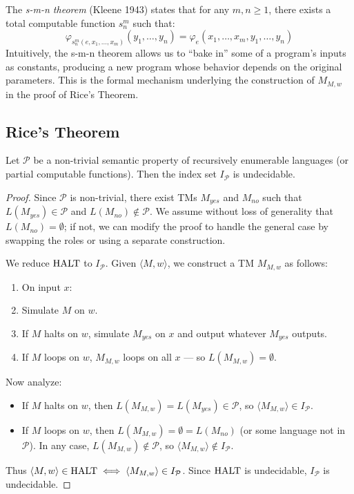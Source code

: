 \begin{definition}
The \emph{s-m-n theorem} (Kleene 1943) states that for any $m,n \geq 1$, there exists a total computable function $s^m_n$ such that:
\[
\varphi_{s^m_n(e, x_1, \ldots, x_m)}(y_1, \ldots, y_n) = \varphi_e(x_1, \ldots, x_m, y_1, \ldots, y_n)
\]
Intuitively, the s-m-n theorem allows us to ``bake in'' some of a program's inputs as constants, producing a new program whose behavior depends on the original parameters. This is the formal mechanism underlying the construction of $M_{M,w}$ in the proof of Rice's Theorem.
\end{definition}

\subsection{Rice's Theorem}
\label{sec:rice:theorem}

\begin{theorem}
Let $\mathcal{P}$ be a non-trivial semantic property of recursively enumerable languages (or partial computable functions). Then the index set $I_\mathcal{P}$ is undecidable.
\end{theorem}

\begin{proof}
Since $\mathcal{P}$ is non-trivial, there exist TMs $M_{yes}$ and $M_{no}$ such that $L(M_{yes}) \in \mathcal{P}$ and $L(M_{no}) \notin \mathcal{P}$. We assume without loss of generality that $L(M_{no}) = \emptyset$; if not, we can modify the proof to handle the general case by swapping the roles or using a separate construction.

We reduce $\text{HALT}$ to $I_\mathcal{P}$. Given $\langle M, w \rangle$, we construct a TM $M_{M,w}$ as follows:

\begin{enumerate}
\item On input $x$:
\item Simulate $M$ on $w$.
\item If $M$ halts on $w$, simulate $M_{yes}$ on $x$ and output whatever $M_{yes}$ outputs.
\item If $M$ loops on $w$, $M_{M,w}$ loops on all $x$ --- so $L(M_{M,w}) = \emptyset$.
\end{enumerate}

Now analyze:

\begin{itemize}
\item If $M$ halts on $w$, then $L(M_{M,w}) = L(M_{yes}) \in \mathcal{P}$, so $\langle M_{M,w} \rangle \in I_\mathcal{P}$.
\item If $M$ loops on $w$, then $L(M_{M,w}) = \emptyset = L(M_{no})$ (or some language not in $\mathcal{P}$). In any case, $L(M_{M,w}) \notin \mathcal{P}$, so $\langle M_{M,w} \rangle \notin I_\mathcal{P}$.
\end{itemize}

Thus $\langle M, w \rangle \in \text{HALT} \iff \langle M_{M,w} \rangle \in I_\mathcal{P}$. Since $\text{HALT}$ is undecidable, $I_\mathcal{P}$ is undecidable.
\end{proof}

